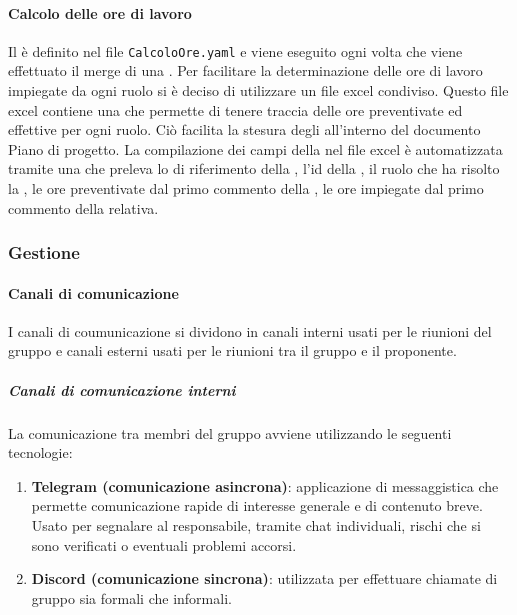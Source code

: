 \paragraph{Calcolo delle ore di lavoro}
\label{par:calcolo_ore_lavoro}
Il  è definito nel file \texttt{CalcoloOre.yaml} e viene eseguito ogni volta che viene effettuato il merge di una .
Per facilitare la determinazione delle ore di lavoro impiegate da ogni ruolo si è deciso di utilizzare un file excel condiviso.
Questo file excel contiene una  che permette di tenere traccia delle ore preventivate ed effettive per ogni ruolo.
Ciò facilita la stesura degli  all'interno del documento Piano di progetto.
La compilazione dei campi della  nel file excel è automatizzata tramite una  che preleva lo  di riferimento della ,
l'id della , il ruolo che ha risolto la , le ore preventivate dal primo commento della , le ore impiegate dal primo commento della  relativa.

\subsubsection{Gestione}
\paragraph{Canali di comunicazione}
I canali di coumunicazione si dividono in canali interni usati per le riunioni del gruppo e canali esterni usati per le riunioni tra il gruppo e il proponente.

\subparagraph{Canali di comunicazione interni}
\label{subpar:canali_interni}
La comunicazione tra membri del gruppo avviene utilizzando le seguenti tecnologie:
\begin{enumerate}
    \item \textbf{Telegram (comunicazione asincrona)}: applicazione di messaggistica che permette comunicazione rapide di interesse generale e di contenuto breve.
    Usato per segnalare al responsabile, tramite chat individuali, rischi che si sono verificati o eventuali problemi accorsi.

    \item \textbf{Discord (comunicazione sincrona)}: utilizzata per effettuare chiamate di gruppo sia formali che informali.
\end{enumerate}


